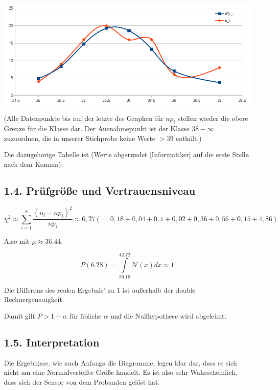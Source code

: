 \documentclass[12pt,a4paper]{article}
\begin{document}
\includegraphics[scale=0.7]{1_3_dichte_vs_data}

\tiny (Alle Datenpunkte bis auf der letzte des Graphen für $n p_i$ stellen wieder die obere Grenze für die Klasse dar. Der Ausnahmepunkt ist der Klasse $38 - \infty$ zuzuordnen, die in unserer Stichprobe keine Werte $> 39$ enthält.)\normalsize

Die dazugehörige Tabelle ist (Werte abgerundet [Informatiker] auf die erste Stelle nach dem Komma):

\subsection*{1.4. Prüfgröße und Vertrauensniveau}
\[
\chi^2 \approx \sum\limits_{i=1}^8 \frac{(n_i -n p_i)^2}{n p_i} \approx 6,27 (= 0,18+0,04+0,1+0,02+0,36+0,56+0,15+4,86)
\]

Also mit $\mu \approx 36.44$:

\[
P(6.28) = \int\limits_{30.16}^{42.72} \mathcal{N}(x) dx \approx 1
\]

\tiny Die Differenz des realen Ergebnis' zu $1$ ist außerhalb der double Rechnergenauigkeit.\normalsize

Damit gilt $P > 1-\alpha$ für übliche $\alpha$ und die Nullhypothese wird abgelehnt.

\subsection*{1.5. Interpretation}
Die Ergebnisse, wie auch Anfangs die Diagramme, legen klar dar, dass es sich nicht um eine Normalverteilte Größe handelt. Es ist also sehr Wahrscheinlich, dass sich der Sensor von dem Probanden gelöst hat.
\end{document}
